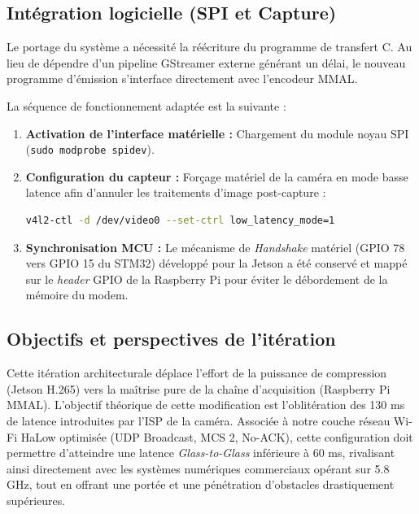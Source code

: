 \subsection{Intégration logicielle (SPI et Capture)}
Le portage du système a nécessité la réécriture du programme de transfert C. 
Au lieu de dépendre d'un pipeline GStreamer externe générant un délai, le nouveau programme 
d'émission s'interface directement avec l'encodeur MMAL. 

La séquence de fonctionnement adaptée est la suivante :
\begin{enumerate}
    \item \textbf{Activation de l'interface matérielle :} Chargement du module noyau SPI (\texttt{sudo modprobe spidev}).
    \item \textbf{Configuration du capteur :} Forçage matériel de la caméra en mode basse latence 
    afin d'annuler les traitements d'image post-capture : 
    \begin{lstlisting}[language=bash]
v4l2-ctl -d /dev/video0 --set-ctrl low_latency_mode=1
    \end{lstlisting}
    \item \textbf{Synchronisation MCU :} Le mécanisme de \textit{Handshake} matériel (GPIO 78 vers 
    GPIO 15 du STM32) développé pour la Jetson a été conservé et mappé sur le \textit{header} 
    GPIO de la Raspberry Pi pour éviter le débordement de la mémoire du modem.
\end{enumerate}

\subsection{Objectifs et perspectives de l'itération}
Cette itération architecturale déplace l'effort de la puissance de compression (Jetson H.265) vers la 
maîtrise pure de la chaîne d'acquisition (Raspberry Pi MMAL). L'objectif théorique de cette modification 
est l'oblitération des 130 ms de latence introduites par l'ISP de la caméra. Associée à notre couche 
réseau Wi-Fi HaLow optimisée (UDP Broadcast, MCS 2, No-ACK), cette configuration doit permettre 
d'atteindre une latence \textit{Glass-to-Glass} inférieure à 60 ms, rivalisant ainsi directement 
avec les systèmes numériques commerciaux opérant sur 5.8 GHz, tout en offrant une portée et une 
pénétration d'obstacles drastiquement supérieures.